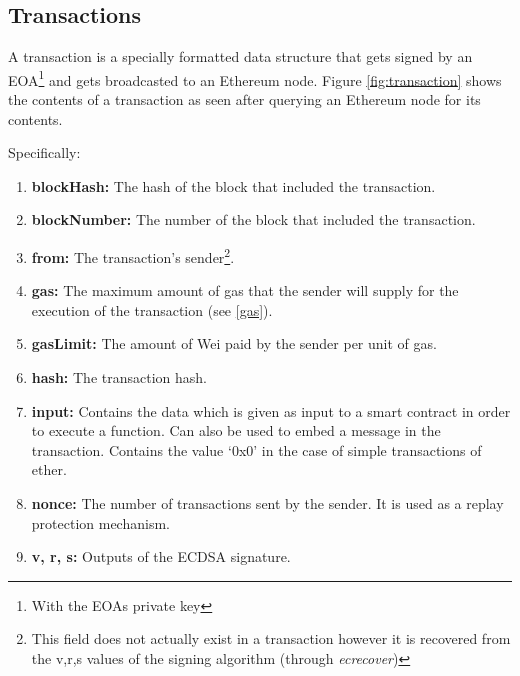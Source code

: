 \subsection{Transactions} \label{transactions}
A transaction is a specially formatted data structure that gets signed by an EOA\footnote{With the EOAs private key} and gets broadcasted to an Ethereum node. Figure \ref{fig:transaction} shows the contents of a transaction as seen after querying an Ethereum node for its contents.


Specifically:
\begin{enumerate}
    \item \textbf{blockHash:} The hash of the block that included the transaction.
    \item \textbf{blockNumber:} The number of the block that included the transaction.
    \item \textbf{from:} The transaction's sender\footnote{This field does not actually exist in a transaction however it is recovered from the v,r,s values of the signing algorithm (through \textit{ecrecover})}.
    \item \textbf{gas:} The maximum amount of gas that the sender will supply for the execution of the transaction (see \ref{gas}).
    \item \textbf{gasLimit:} The amount of Wei paid by the sender per unit of gas.
    \item \textbf{hash:} The transaction hash.
    \item \textbf{input:} Contains the data which is given as input to a smart contract in order to execute a function. Can also be used to embed a message in the transaction. Contains the value `0x0' in the case of simple transactions of ether.
    \item \textbf{nonce:} The number of transactions sent by the sender. It is used as a replay protection mechanism.
    \item \textbf{v, r, s:} Outputs of the ECDSA signature.
\end{enumerate}

